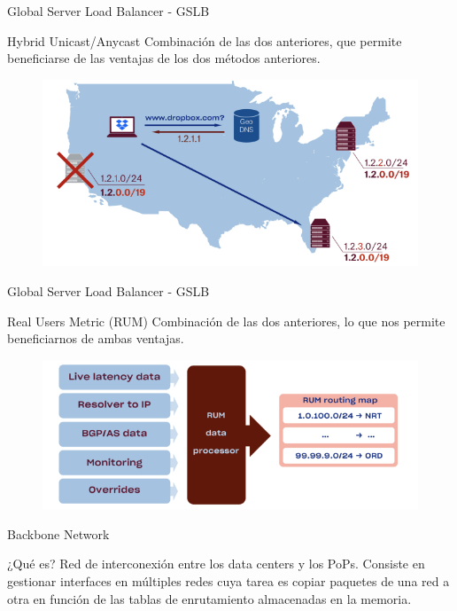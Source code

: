 \documentclass[10pt]{beamer}
\begin{document}
\begin{frame}{Global Server Load Balancer - GSLB}
\begin{alertblock}{Hybrid Unicast/Anycast}
Combinación de las dos anteriores, que permite beneficiarse de las ventajas de los dos métodos anteriores.
\end{alertblock}
\begin{figure}[h]
  \centering
  \includegraphics[width=1\linewidth]{hybrid}
\end{figure}
\end{frame}

\begin{frame}{Global Server Load Balancer - GSLB}
\begin{alertblock}{Real Users Metric (RUM)}
Combinación de las dos anteriores, lo que nos permite beneficiarnos de ambas ventajas.
\end{alertblock}
\begin{figure}[h]
  \centering
  \includegraphics[width=1\linewidth]{rum}
\end{figure}
\end{frame}

\begin{frame}{Backbone Network}
\begin{alertblock}{¿Qué es?}
Red de interconexión entre los data centers y los PoPs. Consiste en gestionar interfaces en múltiples redes cuya tarea es copiar paquetes de una red a otra en función de las tablas de enrutamiento almacenadas en la memoria.
\end{alertblock}
\end{frame}
\end{document}
